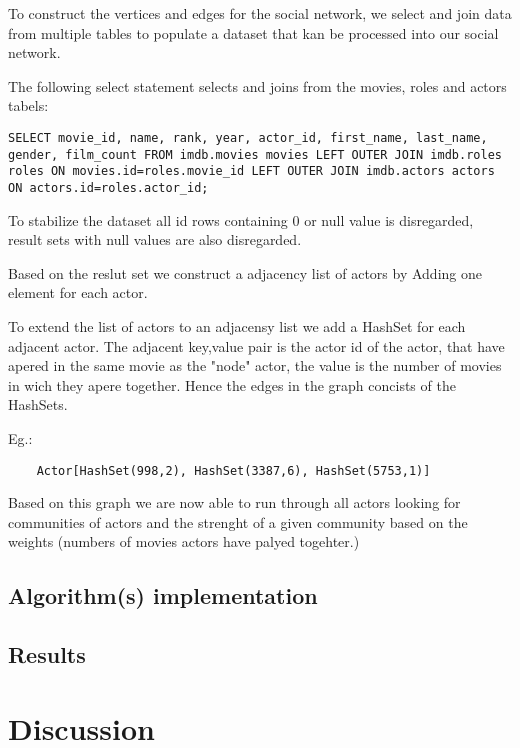 \documentclass{article}
\begin{document}
To construct the vertices and edges for the social network, we select and join data from multiple tables to populate a dataset that kan be processed into our social network.

The following select statement selects and joins from the movies, roles and actors tabels:

\lstset{numbers=left, frame=single, language=SQL, label=Selectstatement}
\begin{lstlisting}
SELECT movie_id, name, rank, year, actor_id, first_name, last_name,
gender, film_count FROM imdb.movies movies LEFT OUTER JOIN imdb.roles
roles ON movies.id=roles.movie_id LEFT OUTER JOIN imdb.actors actors 
ON actors.id=roles.actor_id;
\end{lstlisting}

To stabilize the dataset all id rows containing 0 or null value is disregarded, result sets with null values are also disregarded.

Based on the reslut set we construct a adjacency list of actors by Adding one element for each actor.

To extend the list of actors to an adjacensy list we add a HashSet for each 
adjacent actor. The adjacent key,value pair is the actor id of the actor, that have apered in the same movie as the "node" actor, the value is the number of movies in wich they apere together.
Hence the edges in the graph concists of the HashSets.

Eg.:
\lstset{numbers=left, language=Java, label=Select statement}
\begin{lstlisting}
    Actor[HashSet(998,2), HashSet(3387,6), HashSet(5753,1)] 
\end{lstlisting}

Based on this graph we are now able to run through all actors looking for communities of actors and the strenght of a given community based on the weights (numbers of movies actors have palyed togehter.) 

\subsection{Algorithm(s) implementation}


\subsection{Results}

\section{Discussion}
\end{document}
